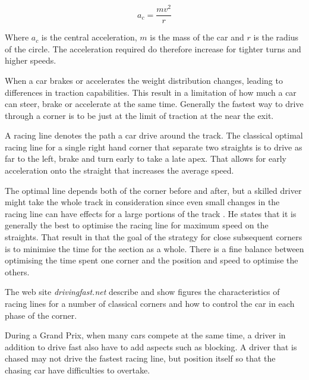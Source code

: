 \[
a_c = \frac{mv^2}{r}
\]

Where $a_c$ is the central acceleration, $m$ is the mass of the car and $r$ is the radius of the circle\cite{beckman_circular_motion}. The acceleration required do therefore increase for tighter turns and higher speeds.

When a car brakes or accelerates the weight distribution changes, leading to differences in traction capabilities. This result in a limitation of how much a car can steer, brake or accelerate at the same time\cite{beckman_weight_transfer}. Generally the fastest way to drive through a corner is to be just at the limit of traction at the near the exit\cite{beckman_racing_line_intro}.  

A racing line denotes the path a car drive around the track. The classical optimal racing line for a single right hand corner that separate two straights is to drive as far to the left, brake and turn early to take a late apex\cite{beckman_racing_line_intro}. That allows for early acceleration onto the straight that increases the average speed.

The optimal line depends both of the corner before and after, but a skilled driver might take the whole track in consideration since even small changes in the racing line can have effects for a large portions of the track \cite{beckman_racing_line_intro}. He states that it is generally the best to optimise the racing line for maximum speed on the straights. That result in that the goal of the strategy for close subsequent corners is to minimise the time for the section as a whole. There is a fine balance between optimising the time spent one corner and the position and speed to optimise the others.

The web site \textit{drivingfast.net} describe and show figures the characteristics of racing lines for a number of classical corners and how to control the car in each phase of the corner\cite{driving_fast_racing_line}\cite{driving_fast_corners}.

During a Grand Prix, when many cars compete at the same time, a driver in addition to drive fast also have to add aspects such as blocking. A driver that is chased may not drive the fastest racing line, but position itself so that the chasing car have difficulties to overtake.

